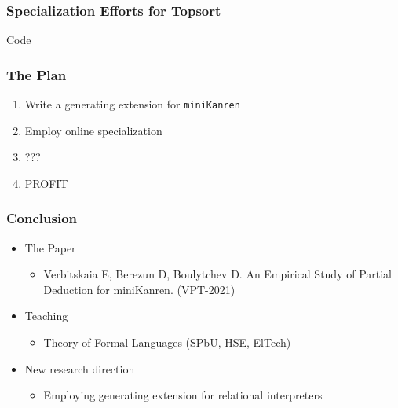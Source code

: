 \documentclass{beamer}
\newcommand{\miniKanren}{\texttt{miniKanren}\xspace}
\begin{document}
\begin{frame}[fragile]
  \frametitle{Specialization Efforts for Topsort}
\begin{center}
  Code
\end{center}
\end{frame}

\begin{frame}[fragile]
  \frametitle{The Plan}
\begin{enumerate}
  \item Write a generating extension for \miniKanren
  \item Employ online specialization
  \item ???
  \item PROFIT
\end{enumerate}

\begin{center}
\end{center}

\begin{center}

\end{center}


\end{frame}

\begin{frame}[fragile]
  \frametitle{Conclusion}
  \begin{itemize}
    \item The Paper
    \begin{itemize}
      \item Verbitskaia E, Berezun D, Boulytchev D. An Empirical Study of Partial Deduction for miniKanren. (VPT-2021)
    \end{itemize}
    \item Teaching
    \begin{itemize}
      \item Theory of Formal Languages (SPbU, HSE, ElTech)
    \end{itemize}
    \item New research direction
    \begin{itemize}
      \item Employing generating extension for relational interpreters
    \end{itemize}
  \end{itemize}
\end{frame}
\end{document}
